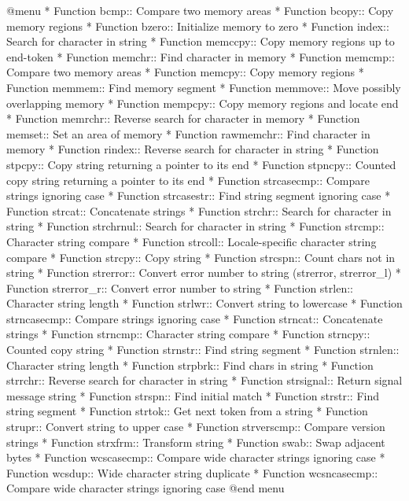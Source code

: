 @menu
* Function bcmp::        Compare two memory areas
* Function bcopy::       Copy memory regions
* Function bzero::       Initialize memory to zero
* Function index::       Search for character in string
* Function memccpy::     Copy memory regions up to end-token
* Function memchr::      Find character in memory
* Function memcmp::      Compare two memory areas
* Function memcpy::      Copy memory regions
* Function memmem::      Find memory segment
* Function memmove::     Move possibly overlapping memory
* Function mempcpy::     Copy memory regions and locate end
* Function memrchr::     Reverse search for character in memory
* Function memset::      Set an area of memory
* Function rawmemchr::   Find character in memory
* Function rindex::      Reverse search for character in string
* Function stpcpy::      Copy string returning a pointer to its end
* Function stpncpy::     Counted copy string returning a pointer to its end
* Function strcasecmp::  Compare strings ignoring case
* Function strcasestr::  Find string segment ignoring case
* Function strcat::      Concatenate strings
* Function strchr::      Search for character in string
* Function strchrnul::   Search for character in string
* Function strcmp::      Character string compare
* Function strcoll::     Locale-specific character string compare
* Function strcpy::      Copy string
* Function strcspn::     Count chars not in string
* Function strerror::    Convert error number to string (strerror, strerror_l)
* Function strerror_r::  Convert error number to string
* Function strlen::      Character string length
* Function strlwr::      Convert string to lowercase
* Function strncasecmp:: Compare strings ignoring case
* Function strncat::     Concatenate strings
* Function strncmp::     Character string compare
* Function strncpy::     Counted copy string
* Function strnstr::     Find string segment
* Function strnlen::     Character string length
* Function strpbrk::     Find chars in string
* Function strrchr::     Reverse search for character in string
* Function strsignal::   Return signal message string
* Function strspn::      Find initial match
* Function strstr::      Find string segment
* Function strtok::      Get next token from a string
* Function strupr::      Convert string to upper case
* Function strverscmp::  Compare version strings
* Function strxfrm::     Transform string
* Function swab::        Swap adjacent bytes
* Function wcscasecmp::  Compare wide character strings ignoring case
* Function wcsdup::      Wide character string duplicate
* Function wcsncasecmp:: Compare wide character strings ignoring case
@end menu

